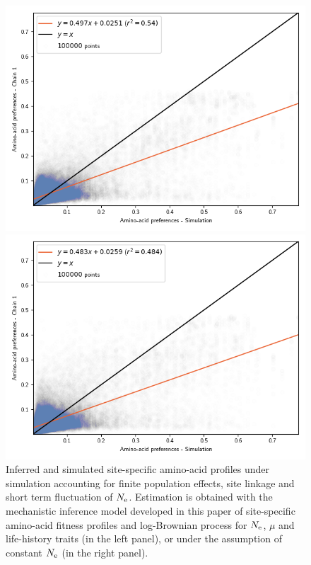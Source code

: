 \documentclass{article}
\begin{document}
	\begin{figure}[H]
		\centering
		\begin{minipage}{0.49\linewidth}
			\includegraphics[width=\linewidth, page=1]{simulations/SimuPoly_SiteMutSelBranchNe_ProfileCorrelation.png}
		\end{minipage} \hfill
		\begin{minipage}{0.49\linewidth}
			\includegraphics[width=\linewidth, page=1]{simulations/SimuPoly_SiteMutSel_ProfileCorrelation.png}
		\end{minipage}
		\caption[Inferred site amino-acid profiles for \texttt{SimuPoly}]{
		Inferred and simulated site-specific amino-acid profiles under simulation accounting for finite population effects, site linkage and short term fluctuation of $N_{\text{e}}$.
		Estimation is obtained with the mechanistic inference model developed in this paper of site-specific amino-acid fitness profiles and log-Brownian process for $N_{\text{e}}$, $\mu$ and life-history traits (in the left panel), or under the assumption of constant $N_{\text{e}}$ (in the right panel).}
	\end{figure}
\end{document}
